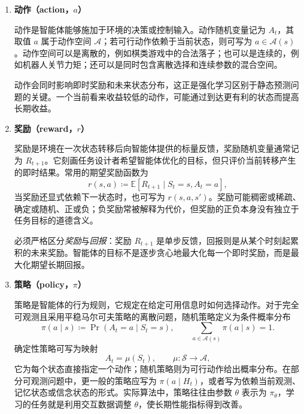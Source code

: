 \documentclass[UTF8,12pt,a4paper,fontset=fandol]{ctexbook}
\begin{document}
\begin{enumerate}[label=\textbf{\arabic*.},leftmargin=3em]
  在完全可观测的马尔可夫决策过程中，智能体能够获得足以确定马尔可夫状态的信息，通常简写为 $O_t=S_t$。在部分可观测的情形下，单个观测不足以预测未来，问题应建模为部分可观测马尔可夫决策过程。此时策略一般需要依赖历史 $H_t$，或者依赖关于隐状态的信念分布
  \[
    b_t(s)=\Pr(S_t=s\mid H_t).
  \]
  因此，\emph{状态是用于描述环境和预测未来的变量，观测是智能体真正能够访问的信息}，二者不能在一般情形下混为一谈。


  \item \textbf{动作（action，$a$）}


  动作是智能体能够施加于环境的决策或控制输入。动作随机变量记为 $A_t$，其取值 $a$ 属于动作空间 $\mathcal{A}$；若可行动作依赖于当前状态，则可写为 $a\in\mathcal{A}(s)$。动作空间可以是离散的，例如棋类游戏中的合法落子；也可以是连续的，例如机器人关节力矩；还可以是同时包含离散选择和连续参数的混合空间。


  动作会同时影响即时奖励和未来状态分布，这正是强化学习区别于静态预测问题的关键。一个当前看来收益较低的动作，可能通过到达更有利的状态而提高长期收益。


  \item \textbf{奖励（reward，$r$）}


  奖励是环境在一次状态转移后向智能体提供的标量反馈，奖励随机变量通常记为 $R_{t+1}$。它刻画任务设计者希望智能体优化的目标，但只评价当前转移产生的即时结果。常用的期望奖励函数为
  \[
    r(s,a)
    \coloneqq \mathbb{E}\!\left[R_{t+1}\mid S_t=s,A_t=a\right],
  \]
  当奖励还显式依赖下一状态时，也可写为 $r(s,a,s')$。奖励可能稠密或稀疏、确定或随机、正或负；负奖励常被解释为代价，但奖励的正负本身没有独立于任务目标的道德含义。


  必须严格区分\emph{奖励}与\emph{回报}：奖励 $R_{t+1}$ 是单步反馈，回报则是从某个时刻起累积的未来奖励。智能体的目标不是逐步贪心地最大化每一个即时奖励，而是最大化期望长期回报。


  \item \textbf{策略（policy，$\pi$）}


  策略是智能体的行为规则，它规定在给定可用信息时如何选择动作。对于完全可观测且采用平稳马尔可夫策略的离散问题，随机策略定义为条件概率分布
  \[
    \pi(a\mid s)
    \coloneqq \Pr(A_t=a\mid S_t=s),
    \qquad
    \sum_{a\in\mathcal{A}(s)}\pi(a\mid s)=1.
  \]
  确定性策略可写为映射
  \[
    A_t=\mu(S_t),
    \qquad \mu:\mathcal{S}\to\mathcal{A},
  \]
  它为每个状态直接指定一个动作；随机策略则为可行动作给出概率分布。在部分可观测问题中，更一般的策略应写为 $\pi(a\mid H_t)$，或者写为依赖当前观测、记忆状态或信念状态的形式。实际算法中，策略往往由参数 $\theta$ 表示为 $\pi_\theta$，学习的任务就是利用交互数据调整 $\theta$，使长期性能指标得到改善。
\end{enumerate}
\end{document}
